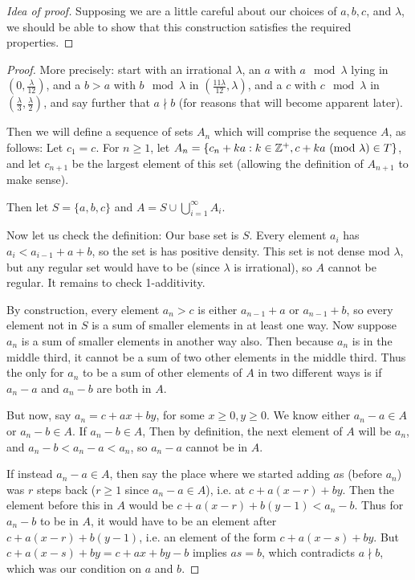 \documentclass{article}
\theoremstyle{definition}
\theoremstyle{remark}
\numberwithin{equation}{section}
\begin{document}
{\begin{proof}[Idea of proof]
  Supposing we are a little careful about our choices of $a, b, c$,
  and $\lambda$, we should be able to show that this construction
  satisfies the required properties.
\end{proof}

\begin{proof}
  More precisely: start with an irrational $\lambda$, an $a$ with
  $a \mod{\lambda}$ lying in $(0, \frac{\lambda}{12})$, and a $b > a$
  with $b \mod{\lambda}$ in $(\frac{11\lambda}{12},\lambda)$, and a
  $c$ with $c \mod{\lambda}$ in $(\frac\lambda 3, \frac\lambda 2)$,
  and say further that $a \nmid b$ (for reasons that will become
  apparent later).

  Then we will define a sequence of sets $A_n$ which will comprise the
  sequence $A$, as follows: Let $c_1 = c$.  For $n \geq 1$, let
  $A_n = \{c_n + ka : k \in \mathbb{Z}^+, c+ka\ (\text{mod}~\lambda) \in T\}$, and let
  $c_{n+1}$ be the largest element of this set (allowing the
  definition of $A_{n+1}$ to make sense).  

  Then let $S = \{a, b, c\}$ and $A = S \cup \bigcup_{i=1}^\infty
  A_i$.  

  Now let us check the definition: Our base set is $S$.  Every element
  $a_i$ has $a_i < a_{i-1} + a + b$, so the set is has positive
  density.  This set is not dense mod $\lambda$, but any regular set
  would have to be (since $\lambda$ is irrational), so $A$ cannot be
  regular.  It remains to check 1-additivity.  

  By construction, every element $a_n > c$ is either $a_{n-1} + a$ or
  $a_{n-1}+b$, so every element not in $S$ is a sum of smaller
  elements in at least one way.  Now suppose $a_n$ is a sum of smaller
  elements in another way also.  Then because $a_n$ is in the middle
  third, it cannot be a sum of two other elements in the middle third.
  Thus the only for $a_n$ to be a sum of other elements of $A$ in two
  different ways is if $a_n - a$ and $a_n - b$ are both in $A$.  

  But now, say $a_n = c + ax + by$, for some $x \geq 0, y \geq 0$.
  We know either $a_n - a \in A$ or $a_n - b \in A$.  If $a_n - b \in
  A$, Then by definition, the next element of $A$ will be $a_n$, and
  $a_n - b < a_n - a < a_n$, so $a_n - a$ cannot be in $A$.  

  If instead $a_n - a \in A$, then say the place where we started
  adding $a$s (before $a_n$) was $r$ steps back ($r \geq 1$ since
  $a_n - a \in A$), i.e. at $c + a(x-r) + by$.  Then the element
  before this in $A$ would be $c + a(x-r) + b(y-1) < a_n - b$.  Thus
  for $a_n - b$ to be in $A$, it would have to be an element after
  $c + a(x-r) + b(y-1)$, i.e. an element of the form
  $c + a(x-s) + by$.  But $c + a(x-s) + by = c + ax + by - b$ implies
  $as = b$, which contradicts $a \nmid b$, which was our condition on
  $a$ and $b$.  


\end{proof}}
\end{document}
